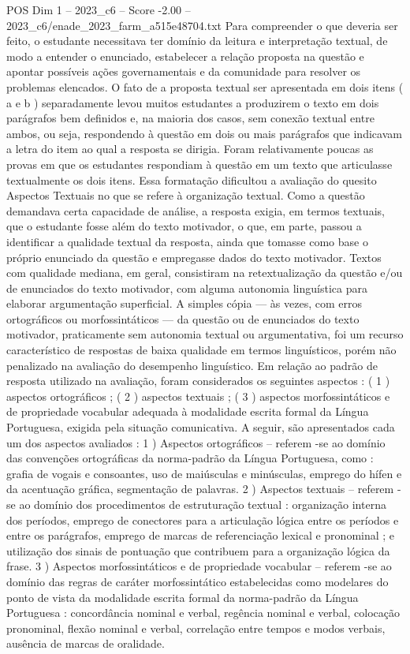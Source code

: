 \begin{textsample}{POS Dim 1 – 2023\_c6 – Score -2.00 – 2023\_c6/enade\_2023\_farm\_a515e48704.txt}
Para compreender o que deveria ser feito, o estudante necessitava ter domínio da leitura e interpretação textual, de modo a entender o enunciado, estabelecer a relação proposta na questão e apontar possíveis ações governamentais e da comunidade para resolver os problemas elencados.
O fato de a proposta textual ser apresentada em dois itens ( a e b ) separadamente levou muitos estudantes a produzirem o texto em dois parágrafos bem definidos e, na maioria dos casos, sem conexão textual entre ambos, ou seja, respondendo à questão em dois ou mais parágrafos que indicavam a letra do item ao qual a resposta se dirigia.
Foram relativamente poucas as provas em que os estudantes respondiam à questão em um texto que articulasse textualmente os dois itens.
Essa formatação dificultou a avaliação do quesito Aspectos Textuais no que se refere à organização textual.
Como a questão demandava certa capacidade de análise, a resposta exigia, em termos textuais, que o estudante fosse além do texto motivador, o que, em parte, passou a identificar a qualidade textual da resposta, ainda que tomasse como base o próprio enunciado da questão e empregasse dados do texto motivador.
Textos com qualidade mediana, em geral, consistiram na retextualização da questão e/ou de enunciados do texto motivador, com alguma autonomia linguística para elaborar argumentação superficial.
A simples cópia — às vezes, com erros ortográficos ou morfossintáticos — da questão ou de enunciados do texto motivador, praticamente sem autonomia textual ou argumentativa, foi um recurso característico de respostas de baixa qualidade em termos linguísticos, porém não penalizado na avaliação do desempenho linguístico.
Em relação ao padrão de resposta utilizado na avaliação, foram considerados os seguintes aspectos : ( 1 ) aspectos ortográficos ; ( 2 ) aspectos textuais ; ( 3 ) aspectos morfossintáticos e de propriedade vocabular adequada à modalidade escrita formal da Língua Portuguesa, exigida pela situação comunicativa.
A seguir, são apresentados cada um dos aspectos avaliados : 1 ) Aspectos ortográficos – referem -se ao domínio das convenções ortográficas da norma-padrão da Língua Portuguesa, como : grafia de vogais e consoantes, uso de maiúsculas e minúsculas, emprego do hífen e da acentuação gráfica, segmentação de palavras. 2 ) Aspectos textuais – referem -se ao domínio dos procedimentos de estruturação textual : organização interna dos períodos, emprego de conectores para a articulação lógica entre os períodos e entre os parágrafos, emprego de marcas de referenciação lexical e pronominal ; e utilização dos sinais de pontuação que contribuem para a organização lógica da frase. 3 ) Aspectos morfossintáticos e de propriedade vocabular – referem -se ao domínio das regras de caráter morfossintático estabelecidas como modelares do ponto de vista da modalidade escrita formal da norma-padrão da Língua Portuguesa : concordância nominal e verbal, regência nominal e verbal, colocação pronominal, flexão nominal e verbal, correlação entre tempos e modos verbais, ausência de marcas de oralidade.

\end{textsample}
